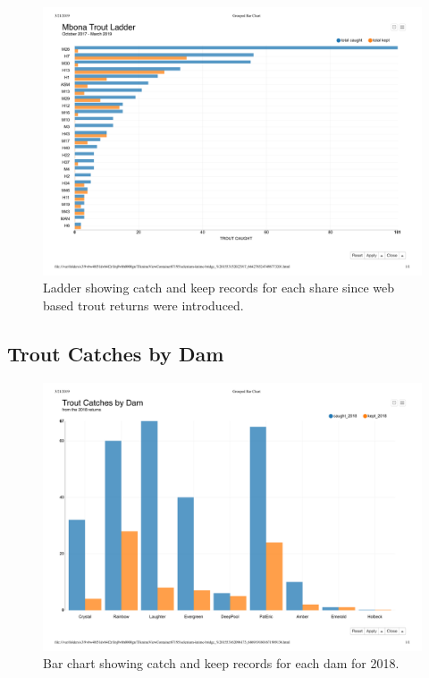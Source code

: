 \begin{figure}[H]
\centering
  \includegraphics[scale=0.5]{tables/MbonaTroutLadder.pdf}
   \caption{Ladder showing catch and keep records for each share since web based trout returns were introduced.}
  \label{fig:MbonaTroutLadder}
\end{figure}


\subsection{Trout Catches by Dam}

\begin{figure}[H]
\centering
  \includegraphics[scale=0.5]{tables/TroutCatchesByDam.pdf}
   \caption{Bar chart showing catch and keep records for each dam for 2018.}
  \label{fig:TroutCatchesByDam}
\end{figure}



